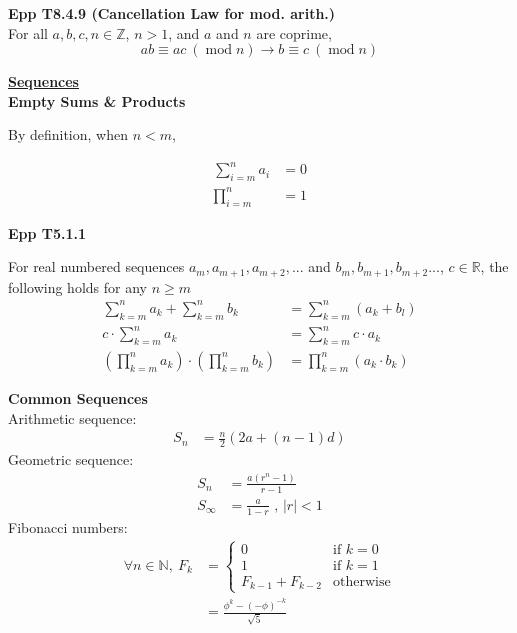 \documentclass[a4paper]{article}
\newcommand{\heading}[1]{{\small\underline{\textbf{#1}}}}
\newcommand{\subheading}[1]{{\scriptsize\textbf{#1}}}
\newcommand\undermod[1]{\ (\operatorname{mod}#1)}
\begin{document}
\begin{multicols*}{4}
\subheading{Epp T8.4.9 (Cancellation Law for mod. arith.)}\\
For all $a, b, c, n \in \mathbb{Z}$, $n>1$, and $a$ and $n$ are coprime,
$$ ab \equiv ac \undermod{n} \rightarrow b \equiv c \undermod{n} $$

\heading{Sequences}\\

\subheading{Empty Sums \& Products}

By definition, when $n < m$,

\begin{align*}
\sum^n_{i=m} a_i &= 0 \\
\prod^n_{i=m} &= 1
\end{align*}

\subheading{Epp T5.1.1}

For real numbered sequences $a_m, a_{m+1}, a_{m+2}, ...$ and $b_m, b_{m+1},
b_{m+2}...$, $c \in \mathbb{R}$, the following holds for any $n \geq m$
\begin{align*}
\sum^n_{k=m} a_k + \sum^n_{k=m} b_k &= \sum^n_{k=m}(a_k + b_l) \\
c \cdot \sum^n_{k=m} a_k &= \sum^n_{k=m} c \cdot a_k\\
\left ( \prod^n_{k=m} a_k \right ) \cdot \left ( \prod^n_{k=m} b_k \right ) &=
  \prod^n_{k=m}(a_k \cdot b_k)
\end{align*}

\vspace{0.3cm}

\subheading{Common Sequences}\\

Arithmetic sequence:
\begin{align*}
S_n &= \frac{n}{2} ( 2a + (n-1)d )
\end{align*}
Geometric sequence:
\begin{align*}
S_n &= \frac{a(r^n - 1)}{r - 1} \\
S_{\infty} &= \frac{a}{1-r}\text{ ,\ \ \ \ $|r| < 1$}
\end{align*}
Fibonacci numbers:
\begin{align*}
\forall n \in \mathbb{N},\ F_k &= \begin{cases}
  0 & \text{if $k=0$} \\
  1 & \text{if $k=1$} \\
  F_{k-1} + F_{k-2} & \text{otherwise}
\end{cases} \\
  &= \frac{\phi^k - (- \phi)^{-k}}{\sqrt{5}}
\end{align*}


\end{multicols*}
\end{document}
